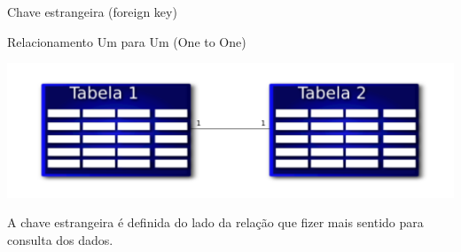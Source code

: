 \documentclass[xcolor=x11names,compress]{beamer}
\begin{document}
\begin{frame}{Chave estrangeira (foreign key)}




\end{frame}

\begin{frame}{Relacionamento Um para Um (One to One)}

\begin{center}
\includegraphics[keepaspectratio,width=\textwidth]{relation_one_to_one}
\end{center}

\begin{block}{}
\centering A chave estrangeira é definida do lado da relação que fizer mais sentido para consulta dos dados.
\end{block}

\end{frame}
\end{document}
